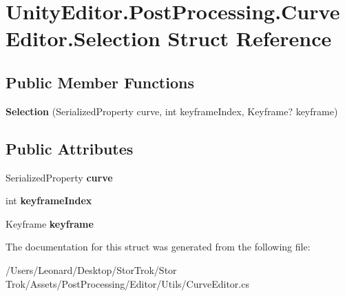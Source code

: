 \hypertarget{struct_unity_editor_1_1_post_processing_1_1_curve_editor_1_1_selection}{}\section{Unity\+Editor.\+Post\+Processing.\+Curve\+Editor.\+Selection Struct Reference}
\label{struct_unity_editor_1_1_post_processing_1_1_curve_editor_1_1_selection}
\subsection*{Public Member Functions}
\begin{DoxyCompactItemize}
\item 
\mbox{\label{struct_unity_editor_1_1_post_processing_1_1_curve_editor_1_1_selection_aec7d22cb022a0018f74986c6e7dee9dd}} 
{\bfseries Selection} (Serialized\+Property curve, int keyframe\+Index, Keyframe? keyframe)
\end{DoxyCompactItemize}
\subsection*{Public Attributes}
\begin{DoxyCompactItemize}
\item 
\mbox{\label{struct_unity_editor_1_1_post_processing_1_1_curve_editor_1_1_selection_a1e1a968fd45439d25970a792a4b6507c}} 
Serialized\+Property {\bfseries curve}
\item 
\mbox{\label{struct_unity_editor_1_1_post_processing_1_1_curve_editor_1_1_selection_aa592863c4ef55aa09ca57ac7b5b9fbe5}} 
int {\bfseries keyframe\+Index}
\item 
\mbox{\label{struct_unity_editor_1_1_post_processing_1_1_curve_editor_1_1_selection_a15a30ec45b9899c209e56e18b6f19a1f}} 
Keyframe {\bfseries keyframe}
\end{DoxyCompactItemize}


The documentation for this struct was generated from the following file\+:\begin{DoxyCompactItemize}
\item 
/\+Users/\+Leonard/\+Desktop/\+Stor\+Trok/\+Stor Trok/\+Assets/\+Post\+Processing/\+Editor/\+Utils/Curve\+Editor.\+cs\end{DoxyCompactItemize}
